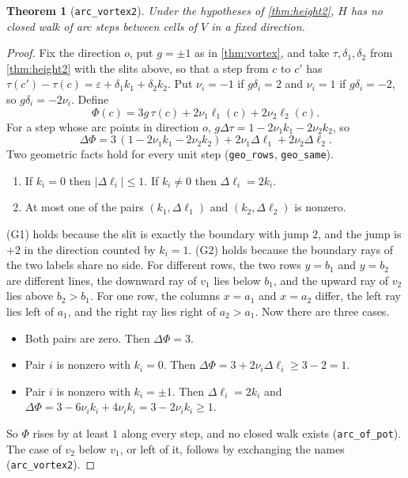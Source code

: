 \documentclass[11pt]{article}
\theoremstyle{plain}
\newtheorem{theorem}{Theorem}[section]
\theoremstyle{definition}
\theoremstyle{remark}
\newcommand{\lean}[1]{\texttt{#1}}
\begin{document}
\begin{theorem}[\lean{arc\_vortex2}]
\label{thm:vortex2}
Under the hypotheses of \cref{thm:height2}, $H$ has no closed walk of arc steps between cells of
$V$ in a fixed direction.
\end{theorem}

\begin{proof}
Fix the direction $o$, put $g=\pm1$ as in \cref{thm:vortex}, and take $\tau,\delta_1,\delta_2$ from
\cref{thm:height2} with the slits above, so that a step from $c$ to $c'$ has
$\tau(c')-\tau(c)=\varepsilon+\delta_1k_1+\delta_2k_2$.
Put $\nu_i=-1$ if $g\delta_i=2$ and $\nu_i=1$ if $g\delta_i=-2$, so $g\delta_i=-2\nu_i$.
Define
\[\Phi(c)=3g\,\tau(c)+2\nu_1\ell_1(c)+2\nu_2\ell_2(c).\]
For a step whose arc points in direction $o$, $g\Delta\tau=1-2\nu_1k_1-2\nu_2k_2$, so
\[\Delta\Phi=3\,(1-2\nu_1k_1-2\nu_2k_2)+2\nu_1\Delta\ell_1+2\nu_2\Delta\ell_2.\]
Two geometric facts hold for every unit step (\lean{geo\_rows}, \lean{geo\_same}).
\begin{enumerate}[label=(G\arabic*)]
\item If $k_i=0$ then $|\Delta\ell_i|\le1$.
  If $k_i\ne0$ then $\Delta\ell_i=2k_i$.
\item At most one of the pairs $(k_1,\Delta\ell_1)$ and $(k_2,\Delta\ell_2)$ is nonzero.
\end{enumerate}
(G1) holds because the slit is exactly the boundary with jump $2$, and the jump is $+2$ in the
direction counted by $k_i=1$.
(G2) holds because the boundary rays of the two labels share no side.
For different rows, the two rows $y=b_1$ and $y=b_2$ are different lines, the downward ray of
$v_1$ lies below $b_1$, and the upward ray of $v_2$ lies above $b_2>b_1$.
For one row, the columns $x=a_1$ and $x=a_2$ differ, the left ray lies left of $a_1$, and the right
ray lies right of $a_2>a_1$.
Now there are three cases.
\begin{itemize}
\item Both pairs are zero.
  Then $\Delta\Phi=3$.
\item Pair $i$ is nonzero with $k_i=0$.
  Then $\Delta\Phi=3+2\nu_i\Delta\ell_i\ge3-2=1$.
\item Pair $i$ is nonzero with $k_i=\pm1$.
  Then $\Delta\ell_i=2k_i$ and $\Delta\Phi=3-6\nu_ik_i+4\nu_ik_i=3-2\nu_ik_i\ge1$.
\end{itemize}
So $\Phi$ rises by at least $1$ along every step, and no closed walk exists
(\lean{arc\_of\_pot}).
The case of $v_2$ below $v_1$, or left of it, follows by exchanging the names
(\lean{arc\_vortex2}).
\end{proof}
\end{document}
